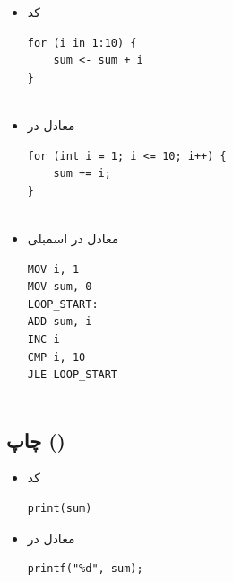 \documentclass[11pt, a4paper, oneside]{book}
\begin{document}
				\begin{itemize}
					
					\item کد 
					\begin{latin}
						\begin{lstlisting}[caption={\lr{R for}}] 
for (i in 1:10) {
	sum <- sum + i
}
							
						\end{lstlisting}
					\end{latin}
					
					\item معادل در 
					\begin{latin}
						\begin{lstlisting}[caption={\lr{C for}}] 
for (int i = 1; i <= 10; i++) {
	sum += i;
}
							
						\end{lstlisting}
					\end{latin}
					
					\item معادل در اسمبلی
					\begin{latin}
						\begin{lstlisting}[caption={\lr{Assembly loop}}] 
MOV i, 1
MOV sum, 0
LOOP_START:
ADD sum, i
INC i
CMP i, 10
JLE LOOP_START
							
						\end{lstlisting}
					\end{latin}
					
				\end{itemize}
								
				
			\subsection{چاپ ()}
				
				\begin{itemize}
					
					\item کد 
					\begin{latin}
						\begin{lstlisting}[caption={\lr{R Print}}] 
print(sum)

						\end{lstlisting}
					\end{latin}
					
					\item معادل در 
					\begin{latin}
						\begin{lstlisting}[caption={\lr{C Print}}] 
printf("%d", sum);

						\end{lstlisting}
					\end{latin}
					
				\end{itemize}
	
\end{document}
